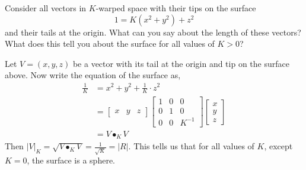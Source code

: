 \documentclass[newpage,hints,handout,12pt,noauthor,nooutcomes]{ximera}
\begin{document}
\begin{problem}
  Consider all vectors in $K$-warped space with their tips on the surface
  \[
  1=K(x^2+y^2)+z^2
  \]
  and their tails at the origin. What can you say about the length of these
  vectors? What does this tell you about the surface for all values of $K>0$?
  
\begin{freeResponse}
Let $V = \left(x,y,z\right)$ be a vector with its tail at the origin and tip on the surface above. Now write the equation of the surface as,
\begin{align*}
\frac{1}{K} &= x^{2} + y^{2} + \frac{1}{K} \cdot z^{2} \\
&= \begin{bmatrix}
	x & y & z
	\end{bmatrix}
\begin{bmatrix}
	1 & 0 & 0 \\
	0 & 1 & 0 \\
	0 & 0 & K^{-1}
	\end{bmatrix}
\begin{bmatrix}
	x \\
	y \\
	z
	\end{bmatrix}\\
&= V \bullet_{K} V
\end{align*}
Then $|V|_{K} = \sqrt{V \bullet_{K} V} = \frac{1}{\sqrt{K}} = |R|$. This tells us that for all values of $K$, except $K=0$, the surface is a sphere. 
\end{freeResponse}

\end{problem}

\end{document}
